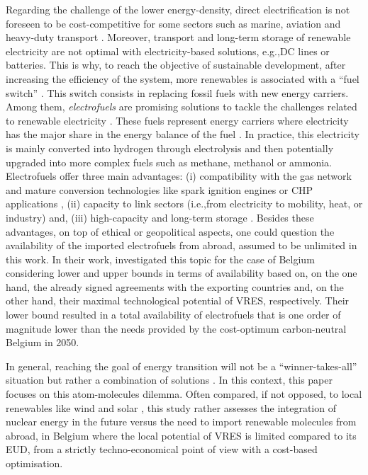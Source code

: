 \documentclass[11pt,twoside,a4paper,english]{article}
\def\eg{e.g.,}
\def\ie{i.e.,}
\begin{document}
Regarding the challenge of the lower energy-density, direct electrification is not foreseen to be cost-competitive for some sectors such as marine, aviation and heavy-duty transport \cite{horvath2018techno, brynolf2018,IEA2021}. Moreover, transport and long-term storage of renewable electricity are not optimal with electricity-based solutions, \eg {DC} lines or batteries. This is why, to reach the objective of sustainable development, after increasing the efficiency of the system, more renewables is associated with a ``fuel switch'' \cite{iea_2019}. This switch consists in replacing fossil fuels with new energy carriers.  Among them, \textit{electrofuels} are promising solutions to tackle the challenges related to renewable electricity \cite{rozzi2020}. These fuels represent energy carriers where electricity has the major share in the energy balance of the fuel \cite{rixhon2021terminology}. In practice, this electricity is mainly converted into hydrogen through electrolysis and then potentially upgraded into more complex fuels such as methane, methanol or ammonia.  Electrofuels offer three main advantages: (i) compatibility with the gas network and mature conversion technologies like spark ignition engines \cite{lhuillier2020experimental} or \gls{CHP} applications \cite{pochet202022}, (ii) capacity to link sectors (\ie from electricity to mobility, heat, or industry) \cite{Stancin2020} and,  (iii) high-capacity and long-term storage \cite{ISPT2017}.  Besides these advantages, on top of ethical or geopolitical aspects, one could question the availability of the imported electrofuels from abroad, assumed to be unlimited in this work. In their work, \citet{lefebvre2022electrofuel} investigated this topic for the case of Belgium considering lower and upper bounds in terms of availability based on, on the one hand, the already signed agreements with the exporting countries and, on the other hand, their maximal technological potential of \gls{VRES}, respectively. Their lower bound resulted in a total availability of electrofuels that is one order of magnitude lower than the needs provided by the cost-optimum carbon-neutral Belgium in 2050. 

In general, reaching the goal of energy transition will not be a ``winner-takes-all'' situation but rather a combination of solutions \cite{Limpens2020,limpens2021generating}. In this context, this paper focuses on this atom-molecules dilemma. Often compared, if not opposed, to local renewables like wind and solar \cite{suna2016nuclear,khatib2016economics}, this study rather assesses the integration of nuclear energy in the future versus the need to import renewable molecules from abroad, in Belgium where the local potential of \gls{VRES} is limited compared to its \gls{EUD}, from a strictly techno-economical point of view with a cost-based optimisation. 
\end{document}
